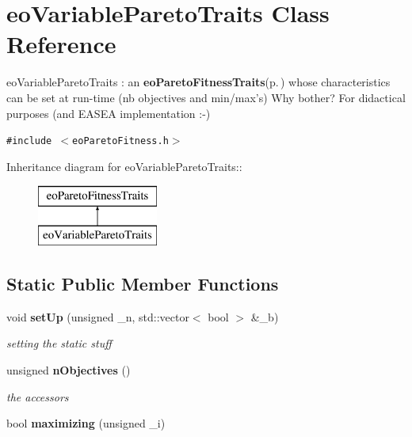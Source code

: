 \section{eo\-Variable\-Pareto\-Traits Class Reference}
\label{classeo_variable_pareto_traits}
eo\-Variable\-Pareto\-Traits : an {\bf eo\-Pareto\-Fitness\-Traits}{\rm (p.\,\pageref{classeo_pareto_fitness_traits})} whose characteristics can be set at run-time (nb objectives and min/max's) Why bother? For didactical purposes (and EASEA implementation :-)  


{\tt \#include $<$eo\-Pareto\-Fitness.h$>$}

Inheritance diagram for eo\-Variable\-Pareto\-Traits::\begin{figure}[H]
\begin{center}
\leavevmode
\includegraphics[height=2cm]{classeo_variable_pareto_traits}
\end{center}
\end{figure}
\subsection*{Static Public Member Functions}
\begin{CompactItemize}
\item 
void {\bf set\-Up} (unsigned \_\-n, std::vector$<$ bool $>$ \&\_\-b)\label{classeo_variable_pareto_traits_e0}

\begin{CompactList}\small\item\em setting the static stuff \item\end{CompactList}\item 
unsigned {\bf n\-Objectives} ()\label{classeo_variable_pareto_traits_e1}

\begin{CompactList}\small\item\em the accessors \item\end{CompactList}\item 
bool {\bf maximizing} (unsigned \_\-i)\label{classeo_variable_pareto_traits_e2}

\end{CompactItemize}
